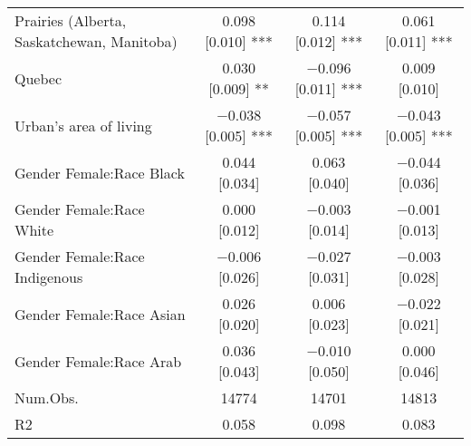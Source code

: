 \begin{table}
\begin{tabular}[t]{lccc}
Prairies (Alberta, Saskatchewan, Manitoba) & \num{0.098} [\num{0.010}] *** & \num{0.114} [\num{0.012}] *** & \num{0.061} [\num{0.011}] ***\\
Quebec & \num{0.030} [\num{0.009}] ** & \num{-0.096} [\num{0.011}] *** & \num{0.009} [\num{0.010}]\\
Urban's area of living & \num{-0.038} [\num{0.005}] *** & \num{-0.057} [\num{0.005}] *** & \num{-0.043} [\num{0.005}] ***\\
Gender Female:Race Black & \num{0.044} [\num{0.034}] & \num{0.063} [\num{0.040}] & \num{-0.044} [\num{0.036}]\\
Gender Female:Race White & \num{0.000} [\num{0.012}] & \num{-0.003} [\num{0.014}] & \num{-0.001} [\num{0.013}]\\
Gender Female:Race Indigenous & \num{-0.006} [\num{0.026}] & \num{-0.027} [\num{0.031}] & \num{-0.003} [\num{0.028}]\\
Gender Female:Race Asian & \num{0.026} [\num{0.020}] & \num{0.006} [\num{0.023}] & \num{-0.022} [\num{0.021}]\\
Gender Female:Race Arab & \num{0.036} [\num{0.043}] & \num{-0.010} [\num{0.050}] & \num{0.000} [\num{0.046}]\\
\midrule
Num.Obs. & \num{14774} & \num{14701} & \num{14813}\\
R2 & \num{0.058} & \num{0.098} & \num{0.083}\\
\bottomrule
\end{tabular}
\end{table}

